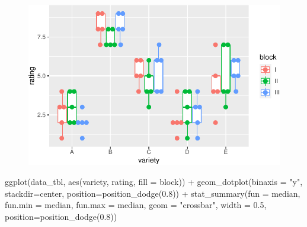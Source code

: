 \documentclass[
  letterpaper,
]{scrbook}
\newenvironment{Shaded}{\begin{snugshade}}{\end{snugshade}}
\newcommand{\AttributeTok}[1]{\textcolor[rgb]{0.40,0.45,0.13}{#1}}
\newcommand{\FloatTok}[1]{\textcolor[rgb]{0.68,0.00,0.00}{#1}}
\newcommand{\FunctionTok}[1]{\textcolor[rgb]{0.28,0.35,0.67}{#1}}
\newcommand{\NormalTok}[1]{\textcolor[rgb]{0.00,0.23,0.31}{#1}}
\newcommand{\SpecialCharTok}[1]{\textcolor[rgb]{0.37,0.37,0.37}{#1}}
\newcommand{\StringTok}[1]{\textcolor[rgb]{0.13,0.47,0.30}{#1}}
\begin{document}
\begin{figure}[H]

{\centering \includegraphics{./app-example-analysis_files/figure-pdf/unnamed-chunk-13-1.pdf}

}

\end{figure}

\begin{Shaded}
\begin{Highlighting}[]
\FunctionTok{ggplot}\NormalTok{(data\_tbl, }\FunctionTok{aes}\NormalTok{(variety, rating, }\AttributeTok{fill =}\NormalTok{ block)) }\SpecialCharTok{+}
  \FunctionTok{geom\_dotplot}\NormalTok{(}\AttributeTok{binaxis =} \StringTok{"y"}\NormalTok{, }\AttributeTok{stackdir=}\StringTok{\textquotesingle{}center\textquotesingle{}}\NormalTok{, }
               \AttributeTok{position=}\FunctionTok{position\_dodge}\NormalTok{(}\FloatTok{0.8}\NormalTok{)) }\SpecialCharTok{+}
  \FunctionTok{stat\_summary}\NormalTok{(}\AttributeTok{fun =}\NormalTok{ median, }\AttributeTok{fun.min =}\NormalTok{ median, }\AttributeTok{fun.max =}\NormalTok{ median,}
               \AttributeTok{geom =} \StringTok{"crossbar"}\NormalTok{, }\AttributeTok{width =} \FloatTok{0.5}\NormalTok{, }
               \AttributeTok{position=}\FunctionTok{position\_dodge}\NormalTok{(}\FloatTok{0.8}\NormalTok{)) }
\end{Highlighting}
\end{Shaded}
\end{document}
